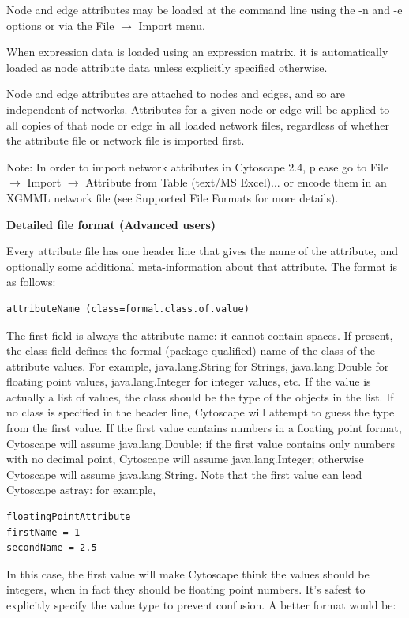  Node and edge attributes may be loaded at the command line using the -n and -e options or via the File $\rightarrow$ Import menu. 

 When expression data is loaded using an expression matrix, it is automatically loaded as node attribute data unless explicitly specified otherwise. 

 Node and edge attributes are attached to nodes and edges, and so are independent of networks. Attributes for a given node or edge will be applied to all copies of that node or edge in all loaded network files, regardless of whether the attribute file or network file is imported first. 

 Note: In order to import network attributes in Cytoscape 2.4, please go to File $\rightarrow$ Import $\rightarrow$ Attribute from Table (text/MS Excel)... or encode them in an XGMML network file (see Supported File Formats for more details). 

 \textbf{Detailed file format (Advanced users)}

 Every attribute file has one header line that gives the name of the attribute, and optionally some additional meta-information about that attribute. The format is as follows: 

 \begin{verbatim}
attributeName (class=formal.class.of.value)
\end{verbatim}

 The first field is always the attribute name: it cannot contain spaces. If present, the class field defines the formal (package qualified) name of the class of the attribute values. For example, java.lang.String for Strings, java.lang.Double for floating point values, java.lang.Integer for integer values, etc. If the value is actually a list of values, the class should be the type of the objects in the list. If no class is specified in the header line, Cytoscape will attempt to guess the type from the first value. If the first value contains numbers in a floating point format, Cytoscape will assume java.lang.Double; if the first value contains only numbers with no decimal point, Cytoscape will assume java.lang.Integer; otherwise Cytoscape will assume java.lang.String. Note that the first value can lead Cytoscape astray: for example, 

 \begin{verbatim}
floatingPointAttribute
firstName = 1
secondName = 2.5
\end{verbatim}

 In this case, the first value will make Cytoscape think the values should be integers, when in fact they should be floating point numbers. It's safest to explicitly specify the value type to prevent confusion. A better format would be: 


